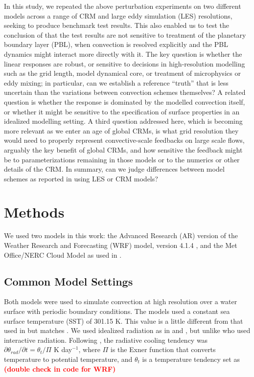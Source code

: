 \documentclass[draft]{agujournal2019}
\newcommand{\todo}[1]{\textcolor{red}{\textbf{(#1)}}}
\begin{document}
In this study, we repeated the above perturbation experiments on two different
models across a range of CRM and large eddy simulation (LES) resolutions,
seeking to produce benchmark test results. This also enabled us to test the
conclusion of  that the test results are not sensitive
to treatment of the planetary boundary layer (PBL), when convection is resolved
explicitly and the PBL dynamics might interact more directly with it. The key 
question is whether the linear responses are robust, or sensitive to decisions in 
high-resolution modelling such as the grid length, model dynamical core, or 
treatment of microphysics or eddy mixing; in particular, can we establish a 
reference ``truth'' that is less uncertain than the variations between convection 
schemes themselves? A related question is whether the response is dominated by the 
modelled convection itself, or whether it might be sensitive to the specification of 
surface properties in an idealized modelling setting. A third question addressed 
here, which is becoming more relevant as we enter an age of global CRMs, is what 
grid resolution they would need to properly represent convective-scale feedbacks on 
large scale flows, arguably the key benefit of global CRMs, and how sensitive the 
feedback might be to parameterizations remaining in those models or to the numerics 
or other details of the CRM. In summary, can we judge differences between model 
schemes as reported in  using LES or CRM models?

\section{Methods}
\label{sec:methods}

We used two models in this work: the Advanced Research (AR) version of the
Weather Research and Forecasting (WRF) model, version 4.1.4
\cite{Skamarock_2019}, and the Met Office/NERC Cloud Model
\cite<MONC,>{Brown_2020} as used in .

\subsection{Common Model Settings}

Both models were used to simulate convection at high resolution over a water
surface with periodic boundary conditions. The models used a constant sea
surface temperature (SST) of 301.15 K. This value is a little different from
that used in  but matches . We
used idealized radiation as in  and
, but unlike  who used interactive
radiation. Following , the radiative cooling tendency
was $\partial \theta_{rad} / \partial t = \theta_t/\Pi$ K day$^{-1}$, where 
$\Pi$ is the Exner function that converts temperature to potential temperature, and 
$\theta_t$ is a temperature tendency set as \todo{double check in code for WRF}
\end{document}
